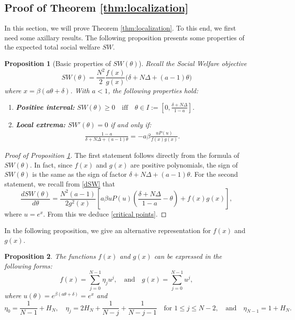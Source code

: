 \documentclass{article}
\newtheorem{proposition}{Proposition}
\begin{document}
\subsection*{Proof of Theorem \ref{thm:localization}} \label{proof-thm}
In this section, we will prove Theorem \ref{thm:localization}. To this end, we first need some axillary results.  The following proposition presents some properties of the expected total social welfare $SW$.
\begin{proposition}[Basic properties of $SW(\theta)$]
\label{prop:sw_basic}
Recall the Social Welfare objective
\[
SW(\theta)= \frac{N^2}{2}\frac{f(x)}{g(x)} \big(\delta + N\Delta + (a-1)\theta\big) 
\]
where $x = \beta(a\theta+\delta)$. With $a < 1$, the following properties hold:
\begin{enumerate}
    \item \textbf{Positive interval:} $
    SW(\theta) \ge 0 \text{ ~ iff ~ } \theta \in I := \left[ 0, \frac{\delta+N\Delta}{1-a}\right]$.
    
    \item \textbf{Local extrema:} $SW'(\theta)=0$ if and only if:
    \begin{align}
         \frac{1-a}{\delta+N\Delta+(a-1)\theta}
    =-a\beta\frac{uP(u)}{f(x)g(x)}. \label{critical points}
    \end{align}   
\end{enumerate}
\end{proposition}
\begin{proof}[Proof of Proposition \ref{prop:sw_basic}]
The first statement follows directly from the formula of $SW(\theta)$. In fact, since $f(x)$ and $g(x)$ are positive polynomials, the sign of $SW(\theta)$ is the same as the sign of factor $\delta + N\Delta + (a-1)\theta$.
For the second statement, we recall from \eqref{dSW}
that 
\[
    \frac{dSW(\theta)}{d\theta} = \frac{N^2(a-1)}{2g^2(x)} \left[ a\beta uP(u) \left( \frac{\delta + N\Delta}{1-a} - \theta \right) + f(x)g(x) \right],
    \]
    where $u=e^x$. From this we deduce \eqref{critical points}.
\end{proof}
In the following proposition, we give an alternative representation for $f(x)$ and $g(x)$.
\begin{proposition}
\label{prop:f and g}
The functions $f(x)$ and $g(x)$ can be expressed in the following forms:
\begin{equation*}
    f(x) = \sum_{j=0}^{N-1} \eta_j u^j, \quad\text{and}\quad g(x) = \sum_{j = 0}^{N-1} u^j,
\end{equation*}    
where $u(\theta) = e^{\beta(a\theta + \delta)} = e^{x}$ and
\[
\eta_0 = \frac{1}{N-1} + H_{N},\quad \eta_j = 2H_{N} + \frac{1}{N-j} + \frac{1}{N-j-1} \quad \text{for } 1 \le j \le N-2,\quad \text{and}\quad
    \eta_{N-1} = 1 + H_{N}.
\]    
\end{proposition}
\end{document}
